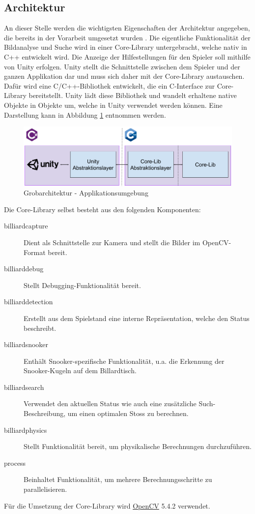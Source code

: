 \subsection{Architektur}\label{sec:architecture}

An dieser Stelle werden die wichtigsten Eigenschaften der Architektur angegeben, die bereits in der Vorarbeit umgesetzt
wurden \cite{project2:architektur}.
Die eigentliche Funktionalität der Bildanalyse und Suche wird in einer Core-Library untergebracht, welche nativ in C++ entwickelt wird.
Die Anzeige der Hilfestellungen für den Spieler soll mithilfe von Unity erfolgen. Unity stellt die Schnittstelle zwischen
dem Spieler und der ganzen Applikation dar und muss sich daher mit der Core-Library austauschen.
Dafür wird eine C/C++-Bibliothek entwickelt, die ein C-Interface zur Core-Library bereitstellt.
Unity lädt diese Bibliothek und wandelt erhaltene native Objekte in Objekte um, welche in Unity verwendet werden können.
Eine Darstellung kann in Abbildung \ref{fig:top-level-architecture} entnommen werden.

\begin{figure}[h!]
    \begin{center}
        \includegraphics[width=0.8\linewidth]{../common/03_billiard_ai/resources/00_top_level_architecture.png}
    \end{center}
    \caption{Grobarchitektur - Applikationsumgebung}
    \label{fig:top-level-architecture}
\end{figure}

Die Core-Library selbst besteht aus den folgenden Komponenten:
\begin{description}
    \item[billiard\textunderscore capture] Dient als Schnittstelle zur Kamera und stellt die Bilder im OpenCV-Format bereit.
    \item[billiard\textunderscore debug] Stellt Debugging-Funktionalität bereit.
    \item[billiard\textunderscore detection] Erstellt aus dem Spielstand eine interne Repräsentation, welche den Status beschreibt.
    \item[billiard\textunderscore snooker] Enthält Snooker-spezifische Funktionalität, u.a. die Erkennung der Snooker-Kugeln auf dem Billardtisch.
    \item[billiard\textunderscore search] Verwendet den aktuellen Status wie auch eine zusätzliche Such-Beschreibung, um einen optimalen
    Stoss zu berechnen.
    \item[billiard\textunderscore physics] Stellt Funktionalität bereit, um physikalische Berechnungen durchzuführen.
    \item[process] Beinhaltet Funktionalität, um mehrere Berechnungsschritte zu parallelisieren.
\end{description}

Für die Umsetzung der Core-Library wird \href{https://opencv.org}{OpenCV} 5.4.2 verwendet.
